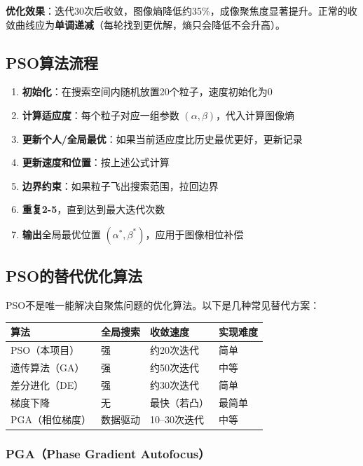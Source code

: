 \documentclass[12pt, a4paper]{article}
\begin{document}
\textbf{优化效果}：迭代30次后收敛，图像熵降低约35\%，成像聚焦度显著提升。正常的收敛曲线应为\textbf{单调递减}（每轮找到更优解，熵只会降低不会升高）。

\subsection{PSO算法流程}

\begin{enumerate}
  \item \textbf{初始化}：在搜索空间内随机放置20个粒子，速度初始化为0
  \item \textbf{计算适应度}：每个粒子对应一组参数 $(\alpha, \beta)$，代入计算图像熵
  \item \textbf{更新个人/全局最优}：如果当前适应度比历史最优更好，更新记录
  \item \textbf{更新速度和位置}：按上述公式计算
  \item \textbf{边界约束}：如果粒子飞出搜索范围，拉回边界
  \item \textbf{重复2-5}，直到达到最大迭代次数
  \item \textbf{输出}全局最优位置 $(\alpha^*, \beta^*)$，应用于图像相位补偿
\end{enumerate}

\subsection{PSO的替代优化算法}

PSO不是唯一能解决自聚焦问题的优化算法。以下是几种常见替代方案：

\begin{keybox}[自聚焦优化算法对比]
\begin{tabular}{llll}
\toprule
算法 & 全局搜索 & 收敛速度 & 实现难度 \\
\midrule
PSO（本项目） & 强 & 约20次迭代 & 简单 \\
遗传算法（GA） & 强 & 约50次迭代 & 中等 \\
差分进化（DE） & 强 & 约30次迭代 & 简单 \\
梯度下降 & 无 & 最快（若凸） & 最简单 \\
PGA（相位梯度） & 数据驱动 & 10--30次迭代 & 中等 \\
\bottomrule
\end{tabular}
\end{keybox}

\subsubsection{PGA（Phase Gradient Autofocus）}
\end{document}
